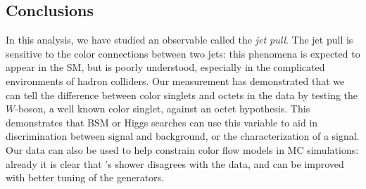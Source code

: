 



\subsection{Conclusions}

In this analysis, we have studied an observable called the \textit{jet pull}. The jet pull is sensitive to the color connections between two jets: this phenomena is expected to appear in the SM, but is poorly understood, especially in the complicated environments of hadron colliders. Our measurement has demonstrated that we can tell the difference between color singlets and octets in the data by testing the $W$-boson, a well known color singlet, against an octet hypothesis. This demonstrates that BSM or Higgs searches can use this variable to aid in discrimination between signal and background, or the characterization of a signal. Our data can also be used to help constrain color flow models in MC simulations: already it is clear that \Pythia's shower disagrees with the data, and can be improved with better tuning of the generators.

